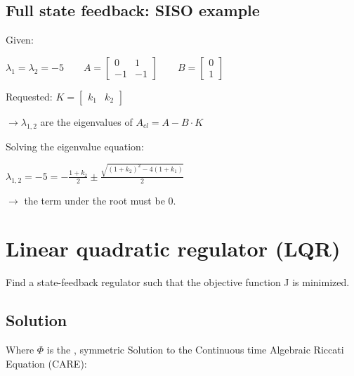 \documentclass[10pt,a4paper]{scrartcl}
\begin{document}
\begin{multicols*}{3}
	\subsection{Full state feedback: SISO example}
	
	Given:
	
	$\lambda_1=\lambda_2=-5\qquad A=\begin{bmatrix}0&1\\-1&-1\end{bmatrix}\qquad B=\begin{bmatrix}0\\1\end{bmatrix}$
	
	Requested: $K=\begin{bmatrix}k_1&k_2\end{bmatrix}$
	
	\finn	
	
	$\rightarrow\lambda_{1,2}$ are the eigenvalues of $A_{cl}=A-B\cdot K$
	
	Solving the eigenvalue equation: 
	
	$\lambda_{1,2}=-5=-\frac{1+k_2}{2}\pm\frac{\sqrt{(1+k_2)^2-4(1+k_1)}}{2}$
	
	$\rightarrow$ the term under the root must be 0.
	
	\section[LQR]{Linear quadratic regulator (LQR)}
	
	Find a state-feedback regulator such that the objective function J is minimized.
	
	
	
	
	
	\subsection*{Solution}
	
	
	Where $\Phi$ is the , symmetric Solution to the Continuous time Algebraic Riccati Equation (CARE):
	

\end{multicols*}
\end{document}
